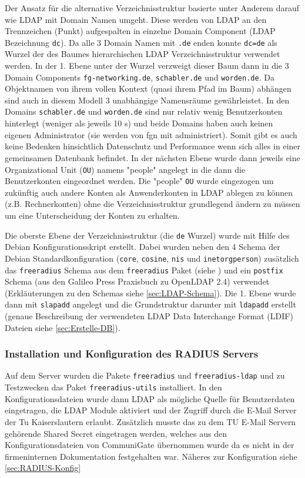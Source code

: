 \documentclass[11pt,a4paper,titlepage=firstiscover,headsepline]{scrartcl} %
\begin{document}
Der Ansatz für die alternative Verzeichnisstruktur basierte unter Anderem darauf wie LDAP mit Domain Namen umgeht. Diese werden von LDAP an den Trennzeichen (Punkt) aufgespalten in einzelne Domain Component (LDAP Bezeichnung \texttt{dc}). Da alle 3 Domain Namen mit \texttt{.de} enden konnte \texttt{dc=de} als Wurzel der des Baumes hierarchischen LDAP Verzeichnisstruktur verwendet werden. In der 1. Ebene unter der Wurzel verzweigt dieser Baum dann in die 3 Domain Components  \texttt{fg-networking.de}, \texttt{schabler.de} und \texttt{worden.de}. Da Objektnamen von ihrem vollen Kontext (quasi ihrem Pfad im Baum) abhängen sind auch in diesem Modell 3 unabhängige Namensräume gewährleistet. In den Domains \texttt{schabler.de} und \texttt{worden.de} sind nur relativ wenig Benutzerkonten hinterlegt (weniger als jeweils 10 s) und beide Domains haben auch keinen eigenen Administrator (sie werden von fgn mit administriert). Somit gibt es auch keine Bedenken hinsichtlich Datenschutz und Performance wenn sich alles in einer gemeinsamen Datenbank befindet. In der nächsten Ebene wurde dann jeweils eine Organizational Unit (\texttt{OU}) namens "people" angelegt in die dann die Benutzerkonten eingeordnet werden. Die "people" \texttt{OU} wurde eingezogen um zukünftig auch andere Konten als Anwenderkonten in LDAP ablegen zu können (z.B. Rechnerkonten) ohne die Verzeichnisstruktur grundlegend ändern zu müssen um eine Unterscheidung der Konten zu erhalten.

Die oberste Ebene der Verzeichnisstruktur (die \texttt{de} Wurzel) wurde mit Hilfe des Debian Konfigurationsskript erstellt. Dabei wurden neben den 4 Schema der Debian Standardkonfiguration (\texttt{core}, \texttt{cosine}, \texttt{nis} und \texttt{inetorgperson}) zusätzlich das \texttt{freeradius} Schema aus dem \texttt{freeradius} Paket (siehe ) und ein \texttt{postfix} Schema (aus den Galileo Press Praxisbuch zu OpenLDAP 2.4) verwendet (Erkläuterungen zu den Schemas siehe \autoref{sec:LDAP-Schema}). Die 1. Ebene wurde dann mit \texttt{slapadd} angelegt und die Grundstruktur darunter mit \texttt{ldapadd} erstellt (genaue Beschreibung der verwendeten LDAP Data Interchange Format (LDIF) Dateien siehe \autoref{sec:Erstelle-DB}).

\subsubsection{Installation und Konfiguration des RADIUS Servers}\label{sec:RADIUS-Konf}
Auf dem Server wurden die Pakete \texttt{freeradius} und \texttt{freeradius-ldap} und zu Testzwecken das Paket \texttt{freeradius-utils} installiert. In den Konfigurationsdateien wurde dann LDAP als mögliche Quelle für Benutzerdaten eingetragen, die LDAP Module aktiviert und der Zugriff durch die E-Mail Server der Tu Kaiserslautern erlaubt. Zusätzlich musste das zu dem TU E-Mail Servern gehörende Shared Secret eingetragen werden, welches aus den Konfigurationsdateien von CommuniGate übernommen wurde da es nicht in der firmeninternen Dokumentation festgehalten war. Näheres zur Konfiguration siehe \autoref{sec:RADIUS-Konfig}
\end{document}
